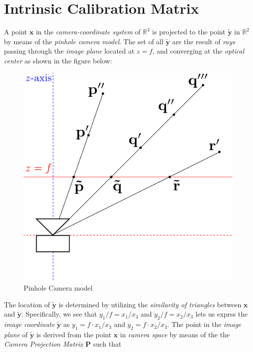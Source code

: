 \documentclass[12pt]{report}
\begin{document}
\section{Intrinsic Calibration Matrix}

\par A point $\mathbf{x}$ in the \textit{camera-coordinate system} of $\mathbb{R}^3$ is projected to the point $\mathbf{\tilde{y}}$ in $\mathbb{R}^{2}$ by means of the \textit{pinhole camera model}. The set of all $\mathbf{\tilde{y}}$ are the result of \textit{rays} passing through the \textit{image plane} located at $z=f$, and converging at the \textit{optical center} as shown in the figure below:
\begin{figure}[htbp]
	\centering
%	
	\includegraphics[scale=0.25]{Camera}
	\caption{Pinhole Camera model}
\end{figure}\newline
The location of $\mathbf{\tilde{y}}$ is determined by utilizing the \textit{similarity of triangles} between $\mathbf{x}$ and $\mathbf{\tilde{y}}$. Specifically, we see that $y_1/f=x_1/x_3$ and $y_2/f=x_2/x_3$ lets us exprss the \textit{image coordinate} $\mathbf{\tilde{y}}$ as $y_1=f\cdot x_1/x_3$ and $y_2=f\cdot x_2/x_3$. The point in the \textit{image plane} of $\mathbf{\tilde{y}}$ is derived from the point $\mathbf{x}$ in \textit{camera space} by means of the the \textit{Camera Projection Matrix} $\mathbf{P}$ such that
\end{document}
